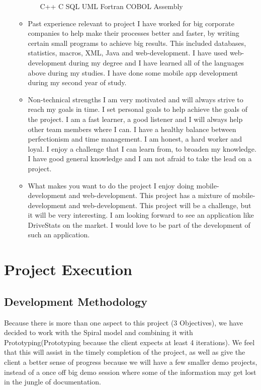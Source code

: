 \documentclass[12pt, oneside]{article}
\begin{document}
\begin{enumerate}
\begin{itemize}
\begin{itemize}
					C++\newline
					C\newline
					SQL\newline
					UML\newline	
					Fortran\newline
					COBOL\newline
					Assembly\newline
				\end{itemize}
			\item Past experience relevant to project\newline
				I have worked for big corporate companies to help make their processes better and faster, by writing 						certain small programs to achieve big results. This included databases, statistics, macros, XML, Java and 						web-development. I have used web-development during my degree and I have learned all of the 							languages above during my studies. I have done some mobile app development during my second year of study.
			\item Non-technical strengths\newline
				I am very motivated and will always strive to reach my goals in time. I set personal goals to help achieve 						the goals of the project. I am a fast learner, a good listener and I will always help other team members 						where I can. I have a healthy balance between perfectionism and time management. I am honest, a hard 						worker and loyal. I enjoy a challenge that I can learn from, to broaden my knowledge. I have good 							general knowledge and I am not afraid to take the lead on a project.
			\item What makes you want to do the project\newline
				I enjoy doing mobile-development and web-development. This project has a mixture of mobile-							development and web-development. This project will be a challenge, but it will be very interesting. I am 						looking forward to see an application like DriveStats on the market. I would love to be part of the 							development of such an application.
		\end{itemize}
	\end{enumerate}
	
\section{Project Execution}
	\subsection{Development Methodology}
		Because there is more than one aspect to this project (3 Objectives), we have decided to work with the Spiral
		model and combining it with Prototyping(Prototyping because the client expects at least 4 iterations).
		We feel that this will assist in the timely completion of the project, as well as give the client a better sense of 
		progress because we will have a few smaller demo projects, instead of a once off big demo session where some of the information may get lost in the jungle of documentation.
		
\end{document}
